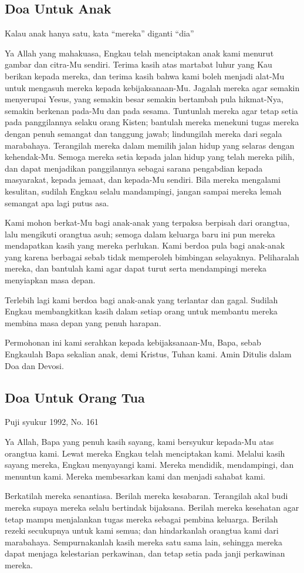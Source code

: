 \documentclass[titlepage,11pt,openany]{scrbook}
\newcommand{\ps}[2][\numexpr\value{subsection}+1\relax]{%
\setcounter{subsection}{\numexpr#1-1\relax}
\subsection{#2}
}
\begin{document}
\ps[160]{Doa Untuk Anak}

Kalau anak hanya satu, kata “mereka” diganti “dia”

Ya Allah yang mahakuasa, Engkau telah menciptakan anak kami menurut gambar dan citra-Mu sendiri. Terima kasih atas martabat luhur yang Kau berikan kepada mereka, dan terima kasih bahwa kami boleh menjadi alat-Mu untuk mengasuh mereka kepada kebijaksanaan-Mu. Jagalah mereka agar semakin menyerupai Yesus, yang semakin besar semakin bertambah pula hikmat-Nya, semakin berkenan pada-Mu dan pada sesama. Tuntunlah mereka agar tetap setia pada panggilannya selaku orang Kisten; bantulah mereka menekuni tugas mereka dengan penuh semangat dan tanggung jawab; lindungilah mereka dari segala marabahaya. Terangilah mereka dalam memilih jalan hidup yang selaras dengan kehendak-Mu. Semoga mereka setia kepada jalan hidup yang telah mereka pilih, dan dapat menjadikan panggilannya sebagai sarana pengabdian kepada masyarakat, kepada jemaat, dan kepada-Mu sendiri. Bila mereka mengalami kesulitan, sudilah Engkau selalu mandampingi, jangan sampai mereka lemah semangat apa lagi putus asa.

Kami mohon berkat-Mu bagi anak-anak yang terpaksa berpisah dari orangtua, lalu mengikuti orangtua asuh; semoga dalam keluarga baru ini pun mereka mendapatkan kasih yang mereka perlukan. Kami berdoa pula bagi anak-anak yang karena berbagai sebab tidak memperoleh bimbingan selayaknya. Peliharalah mereka, dan bantulah kami agar dapat turut serta mendampingi mereka menyiapkan masa depan.

Terlebih lagi kami berdoa bagi anak-anak yang terlantar dan gagal. Sudilah Engkau membangkitkan kasih dalam setiap orang untuk membantu mereka membina masa depan yang penuh harapan.

Permohonan ini kami serahkan kepada kebijaksanaan-Mu, Bapa, sebab Engkaulah Bapa sekalian anak, demi Kristus, Tuhan kami. Amin
Ditulis dalam Doa dan Devosi. 

\ps{Doa Untuk Orang Tua}
Puji syukur 1992, No. 161

Ya Allah, Bapa yang penuh kasih sayang, kami bersyukur kepada-Mu atas orangtua kami. Lewat mereka Engkau telah menciptakan kami. Melalui kasih sayang mereka, Engkau menyayangi kami. Mereka mendidik, mendampingi, dan menuntun kami. Mereka membesarkan kami dan menjadi sahabat kami.

Berkatilah mereka senantiasa. Berilah mereka kesabaran. Terangilah akal budi mereka supaya mereka selalu bertindak bijaksana. Berilah mereka kesehatan agar tetap mampu menjalankan tugas mereka sebagai pembina keluarga. Berilah rezeki secukupnya untuk kami semua; dan hindarkanlah orangtua kami dari marabahaya. Sempurnakanlah kasih mereka satu sama lain, sehingga mereka dapat menjaga kelestarian perkawinan, dan tetap setia pada janji perkawinan mereka.
\end{document}
